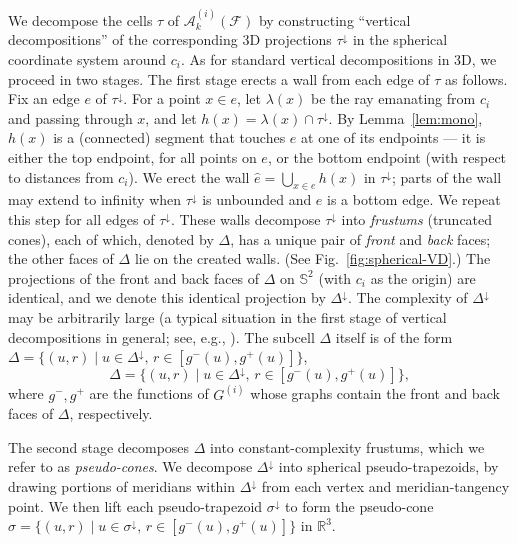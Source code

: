 \documentclass[11pt]{article}
\def\reals{{\mathbb R}}
\def\sphere{{\mathbb S}}
\def\A{\mathcal{A}}
\def\F{\mathcal{F}}
\def\cell{\tau}
\theoremstyle{definition}
\begin{document}
We decompose the cells $\cell$ of $\A_k^{(i)}(\F)$ by constructing ``vertical decompositions'' 
of the corresponding 3D projections $\cell^\downarrow$ in the spherical coordinate system
around $c_i$. As for standard vertical decompositions in 3D, we proceed in two stages. 
The first stage erects a wall from each edge of $\cell$ as follows.
Fix an edge $e$ of $\cell^\downarrow$. For a point $x\in e$, 
let $\lambda(x)$ be the ray emanating from $c_i$ and passing through $x$, and let 
$h(x)= \lambda(x)\cap\cell^\downarrow$. By Lemma~\ref{lem:mono}, $h(x)$ is a (connected) segment that
touches $e$ at one of its endpoints --- it is either the top endpoint,
for all points on $e$, or the bottom endpoint (with respect to distances from $c_i$). 
We erect the wall $\hat e = \bigcup_{x\in e} h(x)$ in $\cell^\downarrow$; 
parts of the wall may extend to infinity when $\cell^\downarrow$ is unbounded and $e$ is 
a bottom edge. We repeat this step for all edges of $\cell^\downarrow$.
These walls decompose $\cell^\downarrow$ into \emph{frustums} (truncated cones), each of 
which, denoted by $\Delta$, has a unique pair of \emph{front} and \emph{back} faces; the
other faces  of $\Delta$ lie on the created walls. (See Fig.~\ref{fig:spherical-VD}.) 
The projections of the front and back 
faces of $\Delta$ on $\sphere^2$ (with $c_i$ as the origin) are identical, and we denote 
this identical projection by $\Delta^\downarrow$. The complexity of $\Delta^\downarrow$ 
may be arbitrarily large (a typical situation in the first stage of vertical decompositions
in general; see, e.g., \cite{CEGS}). The subcell $\Delta$ itself is of the form 
\ifsocgproc
$\Delta = \{ (u,r) \mid u \in \Delta^\downarrow,\, r\in [g^-(u),g^+(u)] \}$,
\else
\[ 
\Delta = \{ (u,r) \mid u \in \Delta^\downarrow,\, r\in [g^-(u),g^+(u)] \} ,
\]
\fi
where $g^-, g^+$ are the functions of $G^{(i)}$ whose graphs contain the front and back faces of $\Delta$,
respectively. 

The second stage decomposes $\Delta$ into constant-complexity frustums, which we refer to as 
\emph{pseudo-cones}. We decompose $\Delta^\downarrow$ into spherical pseudo-trapezoids,
by drawing portions of meridians within $\Delta^\downarrow$ from each vertex and meridian-tangency 
point. We then lift each pseudo-trapezoid $\sigma^\downarrow$ to form the pseudo-cone 
$\sigma = \{ (u,r) \mid u \in \sigma^\downarrow, \, r \in [g^-(u),g^+(u)] \}$ in $\reals^3$.
\end{document}
